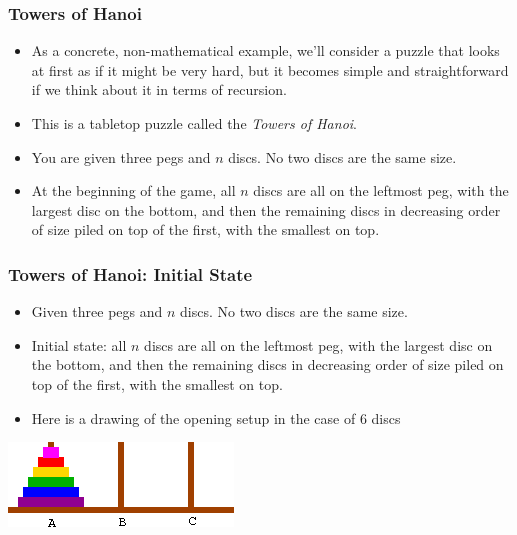  \begin{frame}
\frametitle{Towers of Hanoi }

\begin{itemize}[<+->]


\item As a concrete, non-mathematical example, we'll consider a puzzle
that looks at first as if it might be very hard, but it becomes simple and straightforward if we think about it in terms of recursion.

\item This is a tabletop puzzle called the \emph{Towers of Hanoi}. 

\item You are given three pegs and $n$ discs. No two discs are the same size. 

\item At the beginning of the game, all $n$ discs are all on the leftmost peg, with the largest disc on the bottom, and then the remaining discs in decreasing order of size piled on top of the first, with the smallest on top.


\end{itemize} 

\end{frame}

 \begin{frame}
\frametitle{Towers of Hanoi: Initial State}

\begin{itemize}[<+->]

\item Given three pegs and $n$ discs. No two discs are the same size. 

\item Initial state: all $n$ discs are all on the leftmost peg, with the largest disc on the bottom, and then the remaining discs in decreasing order of size piled on top of the first, with the smallest on top.

\item Here is a drawing of the opening setup in the case of 6 discs %

\end{itemize} 

\includegraphics{Hanoi_n_6_png.png}
\end{frame}

